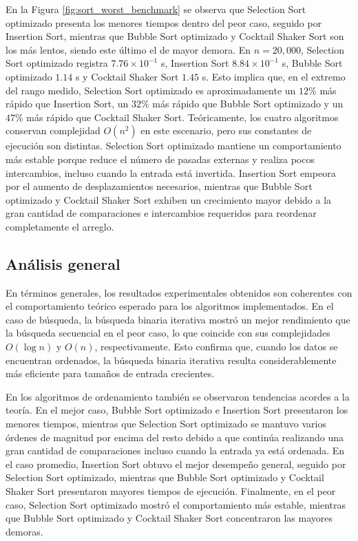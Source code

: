 En la Figura \ref{fig:sort_worst_benchmark} se observa que Selection Sort optimizado presenta los menores tiempos dentro del peor caso, seguido por Insertion Sort, mientras que Bubble Sort optimizado y Cocktail Shaker Sort son los más lentos, siendo este último el de mayor demora. En \(n=20{,}000\), Selection Sort optimizado registra \(7.76 \times 10^{-1}\) s, Insertion Sort \(8.84 \times 10^{-1}\) s, Bubble Sort optimizado \(1.14\) s y Cocktail Shaker Sort \(1.45\) s. Esto implica que, en el extremo del rango medido, Selection Sort optimizado es aproximadamente un \(12\%\) más rápido que Insertion Sort, un \(32\%\) más rápido que Bubble Sort optimizado y un \(47\%\) más rápido que Cocktail Shaker Sort. Teóricamente, los cuatro algoritmos conservan complejidad \(O(n^2)\) en este escenario, pero sus constantes de ejecución son distintas. Selection Sort optimizado mantiene un comportamiento más estable porque reduce el número de pasadas externas y realiza pocos intercambios, incluso cuando la entrada está invertida. Insertion Sort empeora por el aumento de desplazamientos necesarios, mientras que Bubble Sort optimizado y Cocktail Shaker Sort exhiben un crecimiento mayor debido a la gran cantidad de comparaciones e intercambios requeridos para reordenar completamente el arreglo.

\newpage
\subsection{Análisis general}
En términos generales, los resultados experimentales obtenidos son coherentes con el comportamiento teórico esperado para los algoritmos implementados. En el caso de búsqueda, la búsqueda binaria iterativa mostró un mejor rendimiento que la búsqueda secuencial en el peor caso, lo que coincide con sus complejidades \(O(\log n)\) y \(O(n)\), respectivamente. Esto confirma que, cuando los datos se encuentran ordenados, la búsqueda binaria iterativa resulta considerablemente más eficiente para tamaños de entrada crecientes.

En los algoritmos de ordenamiento también se observaron tendencias acordes a la teoría. En el mejor caso, Bubble Sort optimizado e Insertion Sort presentaron los menores tiempos, mientras que Selection Sort optimizado se mantuvo varios órdenes de magnitud por encima del resto debido a que continúa realizando una gran cantidad de comparaciones incluso cuando la entrada ya está ordenada. En el caso promedio, Insertion Sort obtuvo el mejor desempeño general, seguido por Selection Sort optimizado, mientras que Bubble Sort optimizado y Cocktail Shaker Sort presentaron mayores tiempos de ejecución. Finalmente, en el peor caso, Selection Sort optimizado mostró el comportamiento más estable, mientras que Bubble Sort optimizado y Cocktail Shaker Sort concentraron las mayores demoras.

